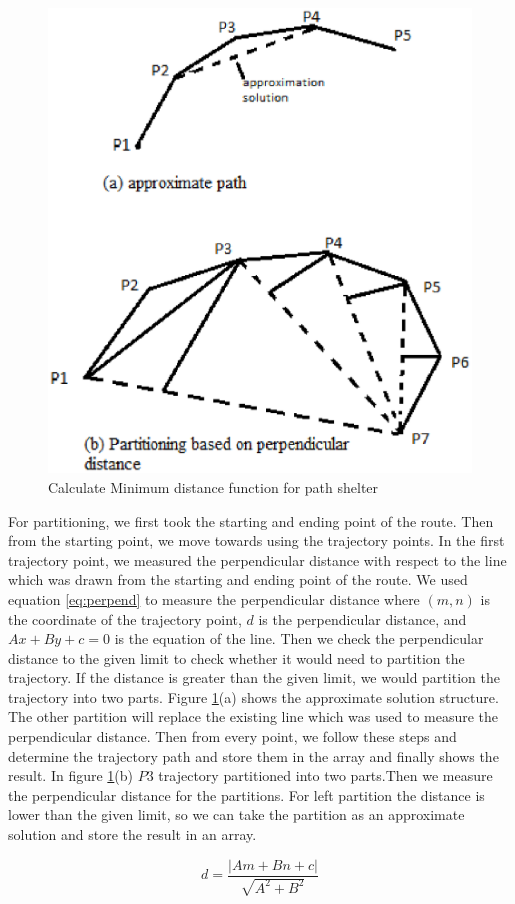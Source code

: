 \documentclass[conference]{IEEEtran}
\begin{document}
\begin{figure}[ht]
	\centering
		\includegraphics[width=.5\textwidth]{fig/trajectory.eps}
	\caption{Calculate Minimum distance function for path shelter}
	\label{Figure:MDLCOST}
\end{figure}
 

For partitioning, we first took the starting and ending point of the route. Then from the starting point, we move towards using the trajectory points. In the first trajectory point, we measured the perpendicular distance with respect to the line which was drawn from the starting and ending point of the route. We used equation \ref{eq:perpend} to measure the perpendicular distance where $(m,n)$ is the coordinate of the trajectory point, $d$ is the perpendicular distance, and $Ax+By+c=0$ is the equation of the line. Then we check the perpendicular distance to the given limit to check whether it would need to partition the trajectory. If the distance is greater than the given limit, we would partition the trajectory into two parts. Figure \ref{Figure:MDLCOST}(a) shows the approximate solution structure. The other partition will replace the existing line which was used to measure the perpendicular distance. Then from every point, we follow these steps and determine the trajectory path and store them in the array and finally shows the result. In figure \ref{Figure:MDLCOST}(b) $P3$ trajectory partitioned into two parts.Then we measure the perpendicular distance for the partitions. For left partition the distance is lower than the given limit, so we can take the partition as an approximate solution and store the result in an array. 

\begin{equation}
d = \frac{|Am+Bn+c|}{\sqrt{A^2+B^2}}
\label{eq:perpend}
\end{equation}
\end{document}
